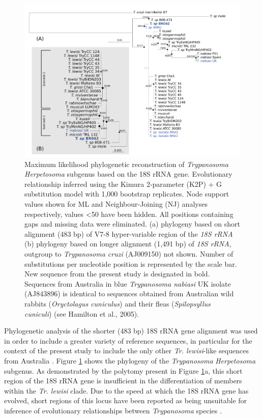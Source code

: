 \documentclass[a4paper, nobind]{templates/ociamthesis}
\begin{document}
\begin{figure}
\includegraphics[width=0.95\linewidth]{figures/ms-figs/Ch5-Fig1} \caption[Phylogeny of \textit{Trypanosoma Herpetosoma} subgenus based on the 18S rRNA gene.]{Maximum likelihood phylogenetic reconstruction of \textit{Trypanosoma Herpetosoma} subgenus based on the 18S rRNA gene. Evolutionary relationship inferred using the Kimura 2-parameter (K2P) + G substitution model with 1,000 bootstrap replicates. Node support values shown for ML and Neighbour-Joining (NJ) analyses respectively, values <50 have been hidden. All positions containing gaps and missing data were eliminated. (a) phylogeny based on short alignment (483 bp) of V7-8 hyper-variable region of the \textit{18S rRNA} (b) phylogeny based on longer alignment (1,491 bp) of \textit{18S rRNA}, outgroup to \textit{Trypanosoma cruzi} (AJ009150) not shown. Number of substitutions per nucleotide position is represented by the scale bar. New sequence from the present study is designated in bold. Sequences from Australia in blue \textit{Trypanosoma nabiasi} UK isolate (AJ843896) is identical to sequences obtained from Australian wild rabbits (\textit{Oryctolagus cuniculus}) and their fleas (\textit{Spilopsyllus cuniculi}) (see Hamilton et al., 2005).}\label{fig:F51}
\end{figure}

Phylogenetic analysis of the shorter (483 bp) 18S rRNA gene alignment was used in order to include a greater variety of reference sequences, in particular for the context of the present study to include the only other \emph{Tr. lewisi}-like sequences from Australia \autocite{hamiltonInadvertentIntroductionAustralia2005,averisDiversityDistributionHostparasite2009}. Figure \ref{fig:F51} shows the phylogeny of the \emph{Trypanosoma} \emph{Herpetosoma} subgenus. As demonstrated by the polytomy present in Figure \ref{fig:F51}a, this short region of the 18S rRNA gene is insufficient in the differentiation of members within the \emph{Tr. lewisi} clade. Due to the speed at which the 18S rRNA gene has evolved, short regions of this locus have been reported as being unsuitable for inference of evolutionary relationships between \emph{Trypanosoma} species \autocite{hamiltonResolvingRelationshipsAustralian2011}.
\end{document}
